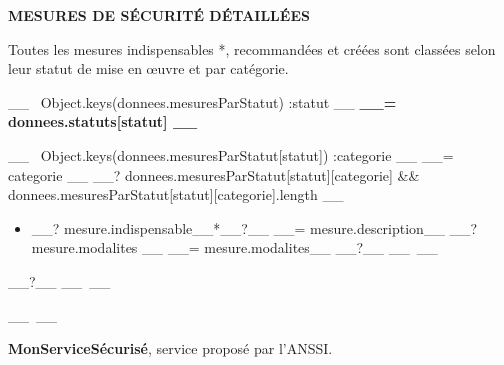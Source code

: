 \documentclass[9pt, a4paper]{article}
\begin{document}
  \textbf{MESURES DE SÉCURITÉ DÉTAILLÉES}

  \textcolor{gris}{Toutes les mesures indispensables *, recommandées et créées sont classées selon
  leur statut de mise en œuvre et par catégorie.}

  \vskip 0.5cm
  __~ Object.keys(donnees.mesuresParStatut) :statut __
    \textbf{__= donnees.statuts[statut] __}

    \begin{tcolorbox}[colback=white, colframe=lisere, boxrule=1px]
      __~ Object.keys(donnees.mesuresParStatut[statut]) :categorie __
        \textcolor{bleu}{__= categorie __}
        __? donnees.mesuresParStatut[statut][categorie] && donnees.mesuresParStatut[statut][categorie].length __
          \begin{itemize}
            __~ donnees.mesuresParStatut[statut][categorie] :mesure __
              \item __? mesure.indispensable__*__?__ __= mesure.description__
                __? mesure.modalites __
                  \textcolor{gris}{__= mesure.modalites__}
                __?__
            __~__
          \end{itemize}
        __?__
      __~__
    \end{tcolorbox}
  __~__
  \vskip 1cm

  \textcolor{bleu}{\textbf{MonServiceSécurisé}}, service proposé par l'ANSSI.
\end{document}
